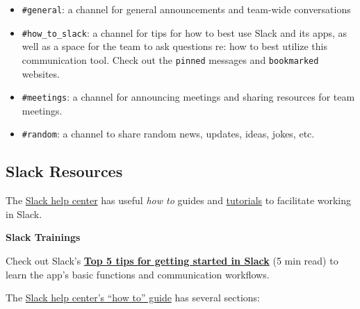 \documentclass[
]{book}
\providecommand{\tightlist}{%
  \setlength{\itemsep}{0pt}\setlength{\parskip}{0pt}}
\begin{document}
\begin{itemize}
\tightlist
\item
  \texttt{\#general}: a channel for general announcements and team-wide conversations
\item
  \texttt{\#how\_to\_slack}: a channel for tips for how to best use Slack and its apps, as well as a space for the team to ask questions re: how to best utilize this communication tool. Check out the \texttt{pinned} messages and \texttt{bookmarked} websites.
\item
  \texttt{\#meetings}: a channel for announcing meetings and sharing resources for team meetings.
\item
  \texttt{\#random}: a channel to share random news, updates, ideas, jokes, etc.
\end{itemize}

\hypertarget{slack-resources}{%
\subsection{Slack Resources}\label{slack-resources}}

The \href{https://slack.com/help/articles/360059928654-How-to-use-Slack--your-quick-start-guide}{Slack help center} has useful \emph{how to} guides and \href{https://slack.com/help/articles/360059976673-Slack-video-tutorials}{tutorials} to facilitate working in Slack.

\textbf{Slack Trainings}

Check out Slack's \href{https://slack.com/intl/en-in/resources/using-slack/top-5-tips-for-getting-started-in-slack}{\textbf{Top 5 tips for getting started in Slack}} (5 min read) to learn the app's basic functions and communication workflows.

The \href{https://slack.com/help/articles/360059928654-How-to-use-Slack--your-quick-start-guide}{Slack help center's ``how to'' guide} has several sections:
\end{document}
